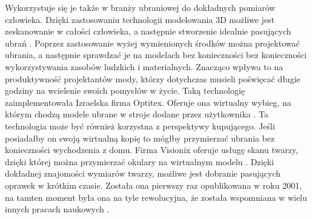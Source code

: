 \newline \indent Wykorzystuje się je także w branży ubraniowej do dokładnych pomiarów człowieka. Dzięki zastosowaniu technologii modelowania 3D możliwe jest zeskanowanie w całości człowieka, a następnie stworzenie idealnie pasujących ubrań \cite{d20073d}. Poprzez zastosowanie wyżej wymienionych środków można projektować ubrania, a następnie sprawdzać je na modelach bez konieczności bez konieczności wykorzystywania zasobów ludzkich i materialnych. Znacząco wpływa to na produktywność projektantów mody, którzy dotychczas musieli poświęcać długie godziny na wcielenie swoich pomysłów w życie. Taką technologię zaimplementowała Izraelska firma Optitex. Oferuje ona wirtualny wybieg, na którym chodzą modele ubrane w stroje dodane przez użytkownika \cite{israelVirtualTryOn}.  
Ta technologia może być również korzystna z perspektywy kupującego. Jeśli posiadałby on swoją wirtualną kopię to mógłby przymierzać ubrania bez konieczności wychodzenia z domu. Firma Visionix oferuje usługę skanu twarzy, dzięki której można przymierzać okulary na wirtualnym modelu \cite{visionX}. Dzięki dokładnej znajomości wymiarów twarzy, możliwe jest dobranie pasujących oprawek w krótkim czasie. Została ona pierwszy raz opublikowana w roku 2001, na tamten moment była ona na tyle rewolucyjna, że została wspomniana w wielu innych pracach naukowych \cite{d20073d} \cite{d2006state}.
